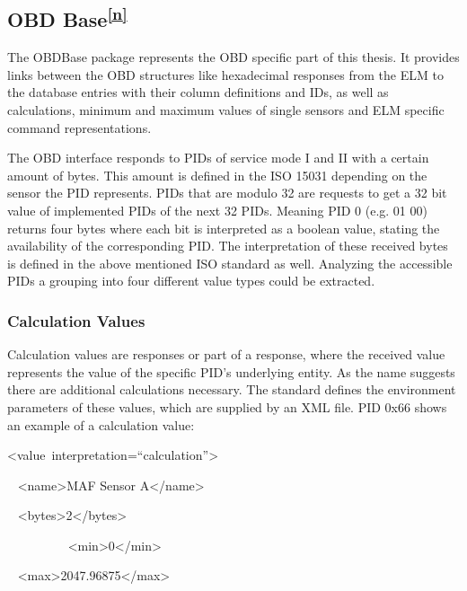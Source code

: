 \hypertarget{h.fbh3ldin73fx}{\subsection{\texorpdfstring{{OBD
Base}\textsuperscript{\protect\hyperlink{cmnt14}{{[}n{]}}}}{OBD Base{[}n{]}}}\label{h.fbh3ldin73fx}}

{The OBDBase package represents the OBD specific part of this thesis. It
provides links between the OBD structures like hexadecimal responses
from the ELM to the database entries with their column definitions and
IDs, as well as calculations, minimum and maximum values of single
sensors and ELM specific command representations.}

{The OBD interface responds to PIDs of service mode I and II with a
certain amount of bytes. This amount is defined in the ISO 15031
depending on the sensor the PID represents. PIDs that are modulo 32 are
requests to get a 32 bit value of implemented PIDs of the next 32 PIDs.
Meaning PID 0 (e.g. 01 00) returns four bytes where each bit is
interpreted as a boolean value, stating the availability of the
corresponding PID. The interpretation of these received bytes is defined
in the above mentioned ISO standard as well. Analyzing the accessible
PIDs a grouping into four different value types could be extracted.}

\hypertarget{h.tbf8n411o12j}{\subsubsection{\texorpdfstring{{Calculation
Values}}{Calculation Values}}\label{h.tbf8n411o12j}}

{Calculation values are responses or part of a response, where the
received value represents the value of the specific PID's underlying
entity. As the name suggests there are additional calculations
necessary. The standard defines the environment parameters of these
values, which are supplied by an XML file. PID 0x66 shows an example of
a calculation value:}

{\textless{}value}{~}{interpretation}{=}{``calculation''\textgreater{}}

{~ }{\textless{}name\textgreater{}}{MAF Sensor
A}{\textless{}/name\textgreater{}}

{~ \textless{}bytes\textgreater{}}{2}{\textless{}/bytes\textgreater{}}

{~~~~~~~~~
}{\textless{}min\textgreater{}}{0}{\textless{}/min\textgreater{}}

{~
\textless{}max\textgreater{}}{2047.96875}{\textless{}/max\textgreater{}}


